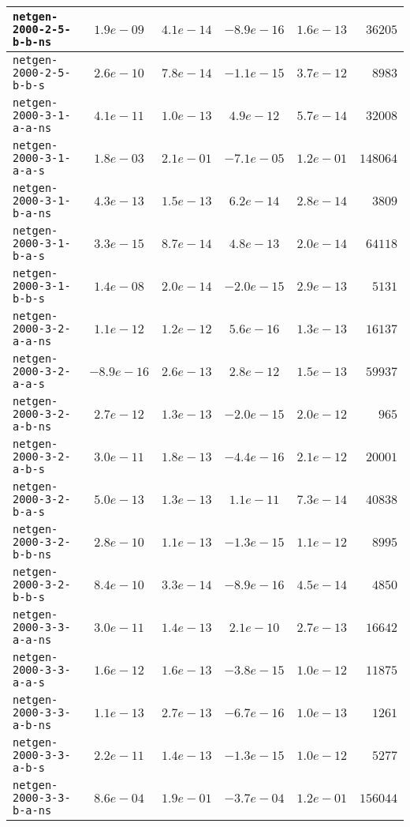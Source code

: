 \begin{center}
\begin{longtable}{|l || c | c | c | c | r|}
\hline
\texttt{netgen-2000-2-5-b-b-ns} & $1.9e-09$ & $4.1e-14$ & $-8.9e-16$ & $1.6e-13$ & $36205$ \\
\hline
\texttt{netgen-2000-2-5-b-b-s} & $2.6e-10$ & $7.8e-14$ & $-1.1e-15$ & $3.7e-12$ & $8983$ \\
\hline
\texttt{netgen-2000-3-1-a-a-ns} & $4.1e-11$ & $1.0e-13$ & $4.9e-12$ & $5.7e-14$ & $32008$ \\
\hline
\texttt{netgen-2000-3-1-a-a-s} & $1.8e-03$ & $2.1e-01$ & $-7.1e-05$ & $1.2e-01$ & $148064$ \\
\hline
\texttt{netgen-2000-3-1-b-a-ns} & $4.3e-13$ & $1.5e-13$ & $6.2e-14$ & $2.8e-14$ & $3809$ \\
\hline
\texttt{netgen-2000-3-1-b-a-s} & $3.3e-15$ & $8.7e-14$ & $4.8e-13$ & $2.0e-14$ & $64118$ \\
\hline
\texttt{netgen-2000-3-1-b-b-s} & $1.4e-08$ & $2.0e-14$ & $-2.0e-15$ & $2.9e-13$ & $5131$ \\
\hline
\texttt{netgen-2000-3-2-a-a-ns} & $1.1e-12$ & $1.2e-12$ & $5.6e-16$ & $1.3e-13$ & $16137$ \\
\hline
\texttt{netgen-2000-3-2-a-a-s} & $-8.9e-16$ & $2.6e-13$ & $2.8e-12$ & $1.5e-13$ & $59937$ \\
\hline
\texttt{netgen-2000-3-2-a-b-ns} & $2.7e-12$ & $1.3e-13$ & $-2.0e-15$ & $2.0e-12$ & $965$ \\
\hline
\texttt{netgen-2000-3-2-a-b-s} & $3.0e-11$ & $1.8e-13$ & $-4.4e-16$ & $2.1e-12$ & $20001$ \\
\hline
\texttt{netgen-2000-3-2-b-a-s} & $5.0e-13$ & $1.3e-13$ & $1.1e-11$ & $7.3e-14$ & $40838$ \\
\hline
\texttt{netgen-2000-3-2-b-b-ns} & $2.8e-10$ & $1.1e-13$ & $-1.3e-15$ & $1.1e-12$ & $8995$ \\
\hline
\texttt{netgen-2000-3-2-b-b-s} & $8.4e-10$ & $3.3e-14$ & $-8.9e-16$ & $4.5e-14$ & $4850$ \\
\hline
\texttt{netgen-2000-3-3-a-a-ns} & $3.0e-11$ & $1.4e-13$ & $2.1e-10$ & $2.7e-13$ & $16642$ \\
\hline
\texttt{netgen-2000-3-3-a-a-s} & $1.6e-12$ & $1.6e-13$ & $-3.8e-15$ & $1.0e-12$ & $11875$ \\
\hline
\texttt{netgen-2000-3-3-a-b-ns} & $1.1e-13$ & $2.7e-13$ & $-6.7e-16$ & $1.0e-13$ & $1261$ \\
\hline
\texttt{netgen-2000-3-3-a-b-s} & $2.2e-11$ & $1.4e-13$ & $-1.3e-15$ & $1.0e-12$ & $5277$ \\
\hline
\texttt{netgen-2000-3-3-b-a-ns} & $8.6e-04$ & $1.9e-01$ & $-3.7e-04$ & $1.2e-01$ & $156044$ \\

\end{longtable}
\end{center}
